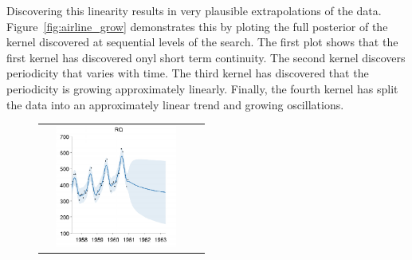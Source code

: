 \documentclass[twoside]{article}
\begin{document}
Discovering this linearity results in very plausible extrapolations of the data.
Figure~\ref{fig:airline_grow} demonstrates this by ploting the full posterior of the kernel discovered at sequential levels of the search.
The first plot shows that the first kernel has discovered onyl short term continuity.
The second kernel discovers periodicity that varies with time.
The third kernel has discovered that the periodicity is growing approximately linearly.
Finally, the fourth kernel has split the data into an approximately linear trend and growing oscillations.


\begin{figure}[h!]
\centering
\newcommand{\wag}{4.8cm}  %
\newcommand{\hag}{4cm}  %
\begin{tabular}{cc}
\includegraphics[width=\wag,height=\hag]{../figures/decomposition/01-airline-s_max_level_0/01-airline-s_all_small}

\end{tabular}
\end{figure}
\end{document}

